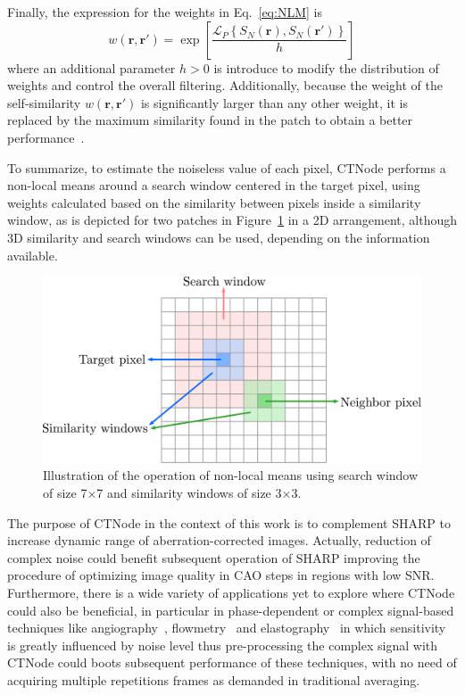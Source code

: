 Finally, the expression for the weights in Eq.~\eqref{eq:NLM} is 
\begin{equation}
    w(\bm{r}, \bm{r}') = \exp\left[\frac{\mathcal{L}_{P}\left\{S_N(\bm{r}), S_N(\bm{r}')\right\}}{h}\right]
\end{equation}
where an additional parameter $h>0$ is introduce to modify the distribution of weights and control the overall filtering. Additionally, because the weight of the self-similarity $w(\bm{r}, \bm{r}')$ is significantly larger than any other weight, it is replaced by the maximum similarity found in the patch to obtain a better performance~\cite{Cuartas-Velez2018_Volumetric}.

To summarize, to estimate the noiseless value of each pixel, CTNode performs a non-local means around a search window centered in the target pixel, using weights calculated based on the similarity between pixels inside a similarity window, as is depicted for two patches in Figure~\ref{fig:CTNodeScheme} in a 2D arrangement, although 3D similarity and search windows can be used, depending on the information available. 

\begin{figure}[htb!]
	\centering
	\includegraphics[width=.8\textwidth]{Figures/SHARP/CTNodeScheme.pdf}
	\caption[Illustration of the operation of non-local means.]{Illustration of the operation of non-local means using search window of size 7$\times$7 and similarity windows of size 3$\times$3.}
	\label{fig:CTNodeScheme}
\end{figure}

The purpose of CTNode in the context of this work is to complement SHARP to increase dynamic range of aberration-corrected images. Actually, reduction of complex noise could benefit subsequent operation of SHARP improving the procedure of optimizing image quality in CAO steps in regions with low SNR. Furthermore, there is a wide variety of applications yet to explore where CTNode could also be beneficial, in particular in phase-dependent or complex signal-based techniques like angiography~\cite{Makita2016_Noiseimmune}, flowmetry~\cite{Uribe-Patarroyo2014_Quantitative} and elastography~\cite{Wang2007_Phasesensitive} in which sensitivity is greatly influenced by noise level thus pre-processing the complex signal with CTNode could boots subsequent performance of these techniques, with no need of acquiring multiple repetitions frames as demanded in traditional averaging.

